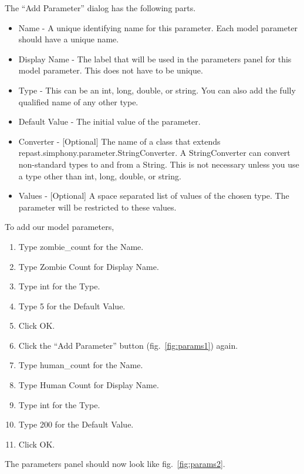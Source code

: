 \documentclass[11pt]{amsart}
\begin{document}
\vspace{.2in}
The  ``Add Parameter'' dialog has the following parts.

\begin{itemize}
\item Name - A unique identifying name for this parameter. Each model parameter should have a unique name.
\item Display Name - The label that will be used in the parameters panel for this model parameter. This does not have to be unique.
\item Type - This can be an int, long, double, or string. You can also add the fully qualified name of any other type.
\item Default Value - The initial value of the parameter.
\item Converter - [Optional] The name of a class that extends\\ repast.simphony.parameter.StringConverter.  A StringConverter can convert non-standard types to and from a String. This is not necessary unless you use a type other than int, long, double, or string.
\item Values - [Optional] A space separated list of values of the chosen type. The parameter will be restricted to these values.
\end{itemize}
\vspace{.2in}

To add our model parameters,

\begin{enumerate}
\item Type zombie\_count for the Name.
\item Type Zombie Count for Display Name.
\item Type int for the Type.
\item Type 5 for the Default Value.
\item Click OK.
\item Click the ``Add Parameter'' button (fig.~\ref{fig:params1}) again.
\item Type human\_count for the Name.
\item Type Human Count for Display Name.
\item Type int for the Type.
\item Type 200 for the Default Value.
\item Click OK.
\end{enumerate}
\vspace{.2in}

\noindent
The  parameters panel should now look like fig.~\ref{fig:params2}.\\
\end{document}

